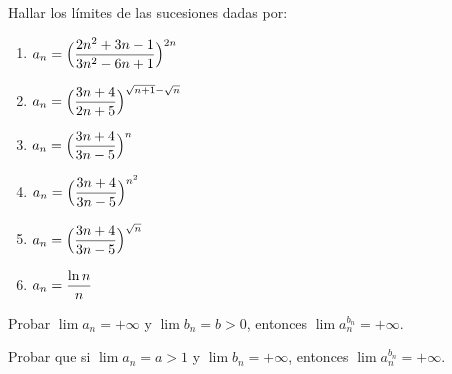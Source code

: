 \item Hallar los límites de las sucesiones dadas por:
\begin{multicols}{2}
    \begin{enumerate}
    \item $\displaystyle a_n = \Big( \frac{2n^2+3n-1}{3n^2-6n+1} \Big)^{2n}$
    \item $\displaystyle a_n = \Big( \frac{3n+4}{2n+5} \Big)^{\sqrt{n+1}-\sqrt{n}}$
    \item $\displaystyle a_n = \Big( \frac{3n+4}{3n-5} \Big)^{n}$
    \item $\displaystyle a_n = \Big( \frac{3n+4}{3n-5} \Big)^{n^2}$
    \item $\displaystyle a_n = \Big( \frac{3n+4}{3n-5} \Big)^{\sqrt{n}}$
    \item $\displaystyle a_n = \frac{\ln n}n$
    \end{enumerate}
\end{multicols}

\item Probar $\lim a_n = +\infty$ y $\lim b_n = b > 0$, entonces $\lim a_n^{b_n} = +\infty$.

\item Probar que si $\lim a_n = a > 1$ y $\lim b_n = +\infty$,
entonces $\lim a_n^{b_n} = +\infty$.
